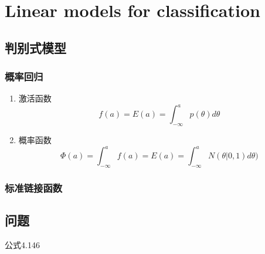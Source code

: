 \chapter{Linear models for classification}

\section{判别式模型}
\subsection{概率回归}
\begin{enumerate}
\item 激活函数
\begin{equation}
f(a) = E(a) = \int_{-\infty}^ap(\theta)d\theta
\end{equation}
\item 概率函数
\begin{equation}
\Phi(a) = \int_{-\infty}^a
f(a) = E(a) = \int_{-\infty}^aN(\theta|0, 1)d\theta)
\end{equation}
\end{enumerate}
\subsection{标准链接函数}
\section{问题}
公式4.146
